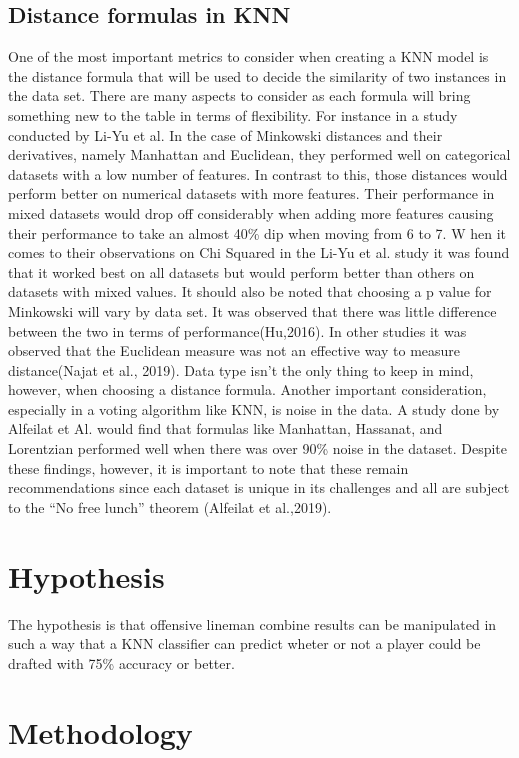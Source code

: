 \documentclass[confrence]{IEEEtran}
\begin{document}
\subsection*{Distance formulas in KNN}
One of the most important metrics to consider when creating a KNN model is the distance formula that will be used to decide the similarity of two instances in the data set. 
There are many aspects to consider as each formula will bring something new to the table in terms of flexibility. 
For instance in a study conducted by Li-Yu et al. 
In the case of Minkowski distances and their derivatives, namely Manhattan and Euclidean, they performed well on categorical datasets with a low number of features.  
In contrast to this, those distances would perform better on numerical datasets with more features. 
Their performance in mixed datasets would drop off considerably when adding more features causing their performance to take an almost 40\% dip when moving from 6 to 7. W
hen it comes to their observations on Chi Squared in the Li-Yu et al. study it was found that it worked best on all datasets but would perform better than others on datasets with mixed values. 
It should also be noted that choosing a p value for Minkowski will vary by data set. It was observed that there was little difference between the two in terms of performance(Hu,2016). 
In other studies it was observed that the Euclidean measure was not an effective way to measure distance(Najat et al., 2019). 
Data type isn't the only thing to keep in mind, however, when choosing a distance formula. Another important consideration, especially in a voting algorithm like KNN, is noise in the data. 
A study done by Alfeilat  et Al. would find that formulas like Manhattan, Hassanat, and Lorentzian performed well when there was over 90\% noise in the dataset. 
Despite these findings, however, it is important to note that these remain recommendations since each dataset is unique in its challenges and all are subject to the “No free lunch” theorem (Alfeilat et al.,2019).
\section*{Hypothesis}
The hypothesis is that offensive lineman combine results can be manipulated in such a way that a KNN classifier can predict wheter or not a player could be drafted with 75\% accuracy or better.
\section*{Methodology}
\end{document}
